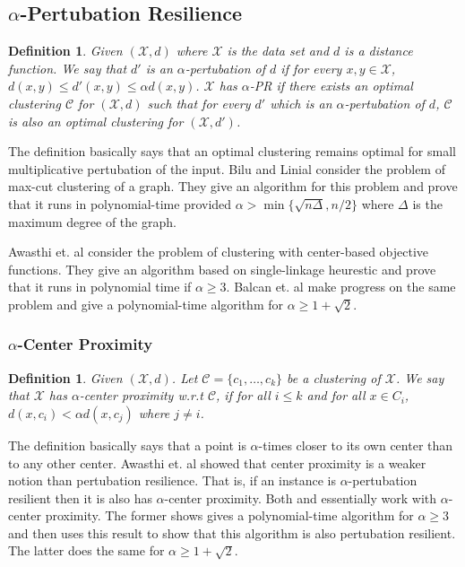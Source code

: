 \documentclass[twoside]{article}
\newcommand{\mc}{\mathcal}
\newtheorem{definition}[theorem]{Definition}
\begin{document}
\subsection*{$\alpha$-Pertubation Resilience \cite{bilu2012stable}}
\begin{definition}
Given $(\mc X, d)$ where $\mc X$ is the data set and $d$ is a distance function. We say that $d'$ is an $\alpha$-pertubation of $d$ if for every $x,y \in \mc X$, $d(x,y) \le d'(x,y) \le \alpha d(x,y)$. $\mc X$ has $\alpha$-PR if there exists an optimal clustering $\mc C$ for $(\mc X, d)$ such that for every $d'$ which is an $\alpha$-pertubation of $d$, $\mc C$ is also an optimal clustering for $(\mc X, d')$.
\end{definition}
The definition basically says that an optimal clustering remains optimal for small multiplicative pertubation of the input. Bilu and Linial \cite{bilu2012stable} consider the problem of max-cut clustering of a graph. They give an algorithm for this problem and prove that it runs in polynomial-time provided $\alpha > \min \{\sqrt{n\Delta}, n/2\}$ where $\Delta$ is the maximum degree of the graph.

Awasthi et. al \cite{awasthi2012center} consider the problem of clustering with center-based objective functions. They give an algorithm based on single-linkage heurestic and prove that it runs in polynomial time if $\alpha \ge 3$. Balcan et. al \cite{balcan2012clustering} make progress on the same problem and give a polynomial-time algorithm for $\alpha \ge 1+\sqrt{2}$. 

\subsubsection*{$\alpha$-Center Proximity \cite{awasthi2012center}}
\begin{definition}
Given $(\mc X, d)$. Let $\mc C = \{c_1, \ldots, c_k\}$ be a clustering of $\mc X$. We say that $\mc X$ has $\alpha$-center proximity w.r.t $\mc C$, if for all $i \le k$ and for all $x \in C_i$, $d(x,c_i) < \alpha d(x, c_j)$ where $j \neq i$.   
\end{definition}
The definition basically says that a point is $\alpha$-times closer to its own center than to any other center.  Awasthi et. al \cite{awasthi2012center} showed that center proximity is a weaker notion than pertubation resilience. That is, if an instance is $\alpha$-pertubation resilient then it is also has $\alpha$-center proximity. Both \cite{awasthi2012center} and \cite{balcan2012clustering} essentially work with $\alpha$-center proximity. The former shows gives a polynomial-time algorithm for $\alpha \ge 3$ and then uses this result to show that this algorithm is also pertubation resilient. The latter does the same for $\alpha \ge 1 + \sqrt{2}$. 
\end{document}
